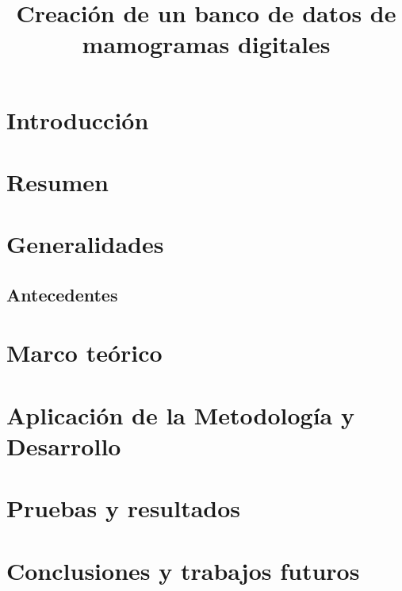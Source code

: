 \documentclass[11pt, a4paper, oneside]{book}
\begin{document}
\title{Creación de un banco de datos de mamogramas digitales}
\maketitle
\tableofcontents

\chapter{Introducción}
\chapter{Resumen}
\chapter{Generalidades}
\section{Antecedentes}
\chapter{Marco teórico}
\chapter{Aplicación de la Metodología y Desarrollo}
\chapter{Pruebas y resultados}
\chapter{Conclusiones y trabajos futuros}
\end{document}
